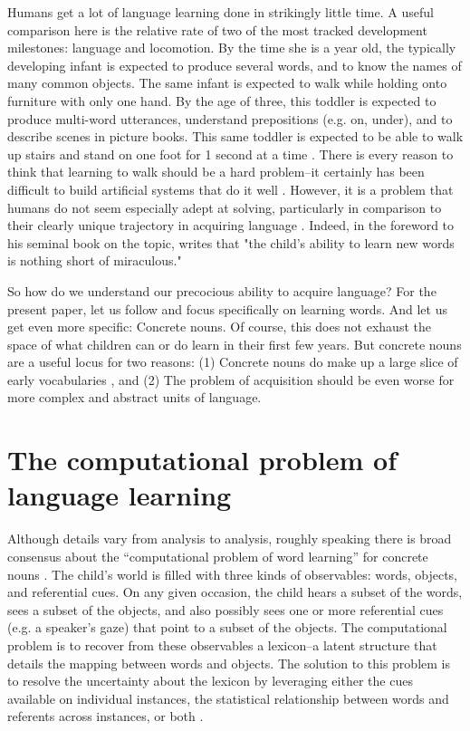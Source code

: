 \documentclass[review]{elsarticle}
\begin{document}
Humans get a lot of language learning done in strikingly little time. A useful comparison here is the relative rate of two of the most tracked development milestones: language and locomotion. By the time she is a year old, the typically developing infant is expected to produce several words, and to know the names of many common objects. The same infant is expected to walk while holding onto furniture with only one hand. By the age of three, this toddler is expected to produce multi-word utterances, understand prepositions (e.g. on, under), and to describe scenes in picture books. This same toddler is expected to be able to walk up stairs and stand on one foot for 1 second at a time \citep{squires2009}. There is every reason to think that learning to walk should be a hard problem--it certainly has been difficult to build artificial systems that do it well \citep[e.g][]{collins2005}. However, it is a problem that humans do not seem especially adept at solving, particularly in comparison to their clearly unique trajectory in acquiring language \citep{capaday2002,garwicz2009,hockett1959}. Indeed, in the foreword to his seminal book on the topic, \cite{bloom2000} writes that "the child's ability to learn new words is nothing short of miraculous."

So how do we understand our precocious ability to acquire language? For the present paper, let us follow \cite{bloom2000} and focus specifically on learning words. And let us get even more specific: Concrete nouns. Of course, this does not exhaust the space of what children can or do learn in their first few years. But concrete nouns are a useful locus for two reasons: (1) Concrete nouns do make up a large slice of early vocabularies \citep{caselli1995, gentner1982}, and (2) The problem of acquisition should be even worse for more complex and abstract units of language.

\section{The computational problem of language learning}

Although details vary from analysis to analysis, roughly speaking there is broad consensus about the ``computational problem of word learning'' for concrete nouns \citep{marr1982}. The child's world is filled with three kinds of observables: words, objects, and referential cues. On any given occasion, the child hears a subset of the words, sees a subset of the objects, and also possibly sees one or more referential cues (e.g. a speaker's gaze) that point to a subset of the objects. The computational problem is to recover from these observables a lexicon--a latent structure that details the mapping between words and objects. The solution to this problem is to resolve the uncertainty about the lexicon by leveraging either the cues available on individual instances, the statistical relationship between words and referents across instances, or both \citep[e.g.,][etc.]{blythe2010, frank2013, kachergis2012, mcmurray2012, siskind1996, yu2008, yurovsky2014}. 
\end{document}

